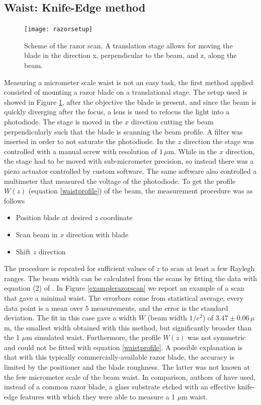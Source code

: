 \subsection{Waist: Knife-Edge method}
\label{sec:knifeedge}
\begin{figure}[H]
\centering
\texttt{[image: razorsetup]}
\caption{Scheme of the razor scan. A translation stage allows for moving the blade in the direction x, perpendicular to the beam, and z, along the beam.}
\label{razorscan}
\end{figure}
Measuring a micrometer scale waist is not an easy task, the first method applied consisted of mounting a razor blade on a translational stage. The setup used is showed in Figure \ref{razorscan}, after the objective the blade is present, and since the beam is quickly diverging after the focus, a lens is used to refocus the light into a photodiode. The stage is moved in the $x$ direction cutting the beam perpendicularly such that the blade is scanning the beam profile. A filter was inserted in order to not saturate the photodiode.
In the $z$ direction the stage was controlled with a manual screw with resolution of $1\,\mu$m. While in the $x$ direction, the stage had to be moved with sub-micrometer precision, so instead there was a piezo actuator controlled by custom software. The same software also controlled a multimeter that measured the voltage of the photodiode. To get the profile $W(z)$ (equation \eqref{waistprofile}) of the beam, the measurement procedure was as follows
\begin{itemize}
\item Position blade at desired $z$ coordinate
\item Scan beam in $x$ direction with blade
\item Shift $z$ direction
\end{itemize}
The procedure is repeated for sufficient values of $z$ to scan at least a few Raylegh ranges. The beam width can be calculated from the scans by fitting the data with equation (2) of \cite{knifeedge}. In Figure \ref{examplerazorscan} we report an example of a scan that gave a minimal waist. The errorbars come from statistical average, every data point is a mean over 5 measurements, and the error is the standard deviation. The fit in this case gave a width $W$ (beam width $1/e^2$) of $3.47\pm 0.06\,\mu$m, the smallest width obtained with this method, but significantly broader than the 1 $\mu$m simulated waist. Furthermore, the profile $W(z)$ was not symmetric and could not be fitted with equation \eqref{waistprofile}. A possible explanation is that with this typically commercially-available razor blade, the accuracy is limited by the positioner and the blade roughness. The latter was not known at the few micrometer scale of the beam waist. In comparison, authors of \cite{Cannon:86} have used, instead of a common razor blade, a glass substrate etched with an effective knife-edge features with which they were able to measure a 1 $\mu$m waist.
